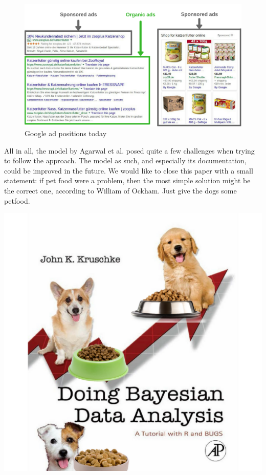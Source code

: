 \begin{figure}
    \centering
    \includegraphics[scale=0.2]{catfoodsearch.png} 
    \caption{Google ad positions today}
    \label{fig:Googletoday}
\end{figure}

\newpage
All in all, the model by Agarwal et al. posed quite a few challenges when trying to follow the approach. The model as such, and especially its documentation, could be improved in the future. We would like to close this paper with a small statement: if pet food were a problem, then the most simple solution might be the correct one, according to William of Ockham. Just give the dogs some petfood.

\begin{center}
    \includegraphics[scale=0.28]{outro.png}
\end{center}
